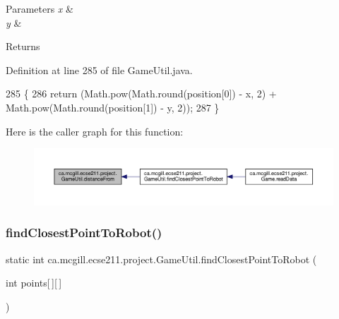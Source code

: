 \begin{DoxyParams}{Parameters}
{\em x} & \\
\hline
{\em y} & \\
\hline
\end{DoxyParams}
\begin{DoxyReturn}{Returns}

\end{DoxyReturn}


Definition at line 285 of file Game\+Util.\+java.


\begin{DoxyCode}
285                                                                      \{
286       \textcolor{keywordflow}{return} (Math.pow(Math.round(position[0]) - x, 2) + Math.pow(Math.round(position[1]) - y, 2));
287   \}
\end{DoxyCode}
Here is the caller graph for this function\+:\nopagebreak
\begin{figure}[H]
\begin{center}
\leavevmode
\includegraphics[width=350pt]{classca_1_1mcgill_1_1ecse211_1_1project_1_1_game_util_a6fb324a3d5e42414c83dfd8bd5910b56_icgraph}
\end{center}
\end{figure}
\mbox{\label{classca_1_1mcgill_1_1ecse211_1_1project_1_1_game_util_a6e0ee94b800ca3727ca8009782abda14}} 
\subsubsection{\texorpdfstring{find\+Closest\+Point\+To\+Robot()}{findClosestPointToRobot()}}
{\footnotesize\ttfamily static int ca.\+mcgill.\+ecse211.\+project.\+Game\+Util.\+find\+Closest\+Point\+To\+Robot (\begin{DoxyParamCaption}\item[{int}]{points\mbox{[}$\,$\mbox{]}\mbox{[}$\,$\mbox{]} }\end{DoxyParamCaption})\hspace{0.3cm}{\ttfamily [static]}}

